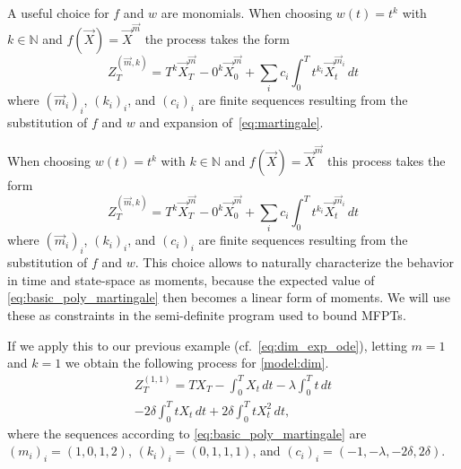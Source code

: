 A useful choice for $f$ and $w$ are monomials.
When choosing $w(t)=t^k$
with $k\in\mathbb N$ and $f(\vec X)={\vec X}^{\vec m}$
the process takes the form
\begin{equation}\label{eq:basic_poly_martingale_app}
Z_T^{(\vec m, k)}=
         T^k \vec X_T^{\vec m}
        - 0^k \vec X_{0}^{\vec m}
        + \sum_{i}c_i\int_0^T t^{k_i} \vec X_t^{\vec m_i}\,dt
\end{equation}
where   $(\vec m_i)_i$, $(k_i)_i$, and $(c_i)_i$ are finite sequences resulting
from the substitution
of $f$ and $w$
and expansion of~\eqref{eq:martingale}.


When choosing $w(t)=t^k$ with $k\in\mathbb N$ and $f(\vec X)={\vec X}^{\vec m}$
this process takes the form
\begin{equation}\label{eq:basic_poly_martingale}
Z_T^{(\vec m, k)}=
         T^k \vec X_T^{\vec m}
        - 0^k \vec X_{0}^{\vec m}
        + \sum_{i}c_i\int_0^T t^{k_i} \vec X_t^{\vec m_i}\,dt
\end{equation}
where   $(\vec m_i)_i$, $(k_i)_i$, and $(c_i)_i$ are finite sequences resulting
from the substitution
of $f$ and $w$.
 This choice allows to naturally
characterize the behavior in time and state-space as moments, because
the expected value of \eqref{eq:basic_poly_martingale} then becomes a linear form
of moments.
We will use these as constraints in the semi-definite program used to bound \acp{MFPT}.

\begin{example}
If we apply this to our previous example (cf.\ \eqref{eq:dim_exp_ode}), letting $m=1$ %
and $k=1$ we obtain the following process for \autoref{model:dim}.
\begin{multline*}
    Z_T^{(1,1)} = TX_T - \int_0^T X_t\,dt
	- \lambda \int_0^T t\,dt\\ - 2\delta
    \int_0^T t X_t\,dt +
    2{\delta}\int_0^TtX_t^2\,dt,
\end{multline*}
where the sequences according to \eqref{eq:basic_poly_martingale} are $(m_i)_i=(1,0,1,2)$, $(k_i)_i=(0,1,1,1)$,
and $(c_i)_i=(-1,-\lambda, -2\delta,2\delta)$.
\end{example}
